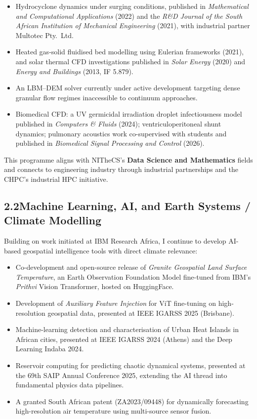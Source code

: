 \documentclass[11pt,a4paper]{article}
\begin{document}
\begin{itemize}
  \item Hydrocyclone dynamics under surging conditions, published in \textit{Mathematical and Computational Applications} (2022) and the \textit{R\&D Journal of the South African Institution of Mechanical Engineering} (2021), with industrial partner Multotec Pty.\ Ltd.
  \item Heated gas-solid fluidised bed modelling using Eulerian frameworks (2021), and solar thermal CFD investigations published in \textit{Solar Energy} (2020) and \textit{Energy and Buildings} (2013, IF 5.879).
  \item An LBM--DEM solver currently under active development targeting dense granular flow regimes inaccessible to continuum approaches.
  \item Biomedical CFD: a UV germicidal irradiation droplet infectiousness model published in \textit{Computers \& Fluids} (2024); ventriculoperitoneal shunt dynamics; pulmonary acoustics work co-supervised with students and published in \textit{Biomedical Signal Processing and Control} (2026).
\end{itemize}

This programme aligns with NITheCS's \textbf{Data Science and Mathematics} fields and connects to engineering industry through industrial partnerships and the CHPC's industrial HPC initiative.

\subsection{2.2\quad Machine Learning, AI, and Earth Systems / Climate Modelling}

Building on work initiated at IBM Research Africa, I continue to develop AI-based geospatial intelligence tools with direct climate relevance:

\begin{itemize}
  \item Co-development and open-source release of \textit{Granite Geospatial Land Surface Temperature}, an Earth Observation Foundation Model fine-tuned from IBM's \textit{Prithvi} Vision Transformer, hosted on HuggingFace.
  \item Development of \textit{Auxiliary Feature Injection} for ViT fine-tuning on high-resolution geospatial data, presented at IEEE IGARSS 2025 (Brisbane).
  \item Machine-learning detection and characterisation of Urban Heat Islands in African cities, presented at IEEE IGARSS 2024 (Athens) and the Deep Learning Indaba 2024.
  \item Reservoir computing for predicting chaotic dynamical systems, presented at the 69th SAIP Annual Conference 2025, extending the AI thread into fundamental physics data pipelines.
  \item A granted South African patent (ZA2023/09448) for dynamically forecasting high-resolution air temperature using multi-source sensor fusion.
\end{itemize}
\end{document}
